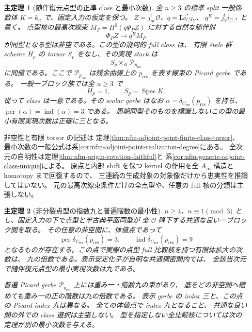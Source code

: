 \documentclass[11pt,a4paper]{ltjsarticle}
\numberwithin{equation}{section}
\newtheorem{maintheorem}{主定理}
\begin{document}
\begin{maintheorem}[随伴復元点型の正準 class と最小次数]
\label{main:nfm-finite-adjoint-point-classes}
全 $n\ge3$ の標準 split 一般係数体 $K=k_n$ で、固定入力の仮定を保つ。
$Z=j_{\mathrm{nc}}^!\mathcal O$、$q=\mathbf Li_C^*j_Y$、
$q^R=j_Y^!i_{C,*}$ と置く。
点型核の最高次線束 $M_P=H^0(q\Phi_PZ)$ に対する自然な随伴射
\[
 \Phi_PZ\longrightarrow q^RM_P
\]
が同型となる型は非空である。この型の幾何的 full class は、
有限 \'etale 群 scheme $H_p$ の torsor $S_p$ をなし、その実現 stack は
\[
 S_p\times_K\mathscr P_{p_{\mathrm{res}}}
\]
に同値である。ここで $\mathscr P_{p_{\mathrm{res}}}$ は残余曲線上の
$p_{\mathrm{res}}$ を表す線束の Picard gerbe である。
一般一ブロック族では全 $n\ge3$ で
\[
 H_p=1,\qquad S_p=\operatorname{Spec}K.
\]
従って class は一意である。その scalar gerbe はなお
$\alpha=\delta_{C_{\mathrm{res}}}(p_{\mathrm{res}})$ を持ち、
$\operatorname{per}(\alpha)=\operatorname{ind}(\alpha)=3$ である。
周期同型そのものを標識しないこの型の最小有限実現次数は正確に三となる。
\end{maintheorem}

非空性と有限 torsor の記述は
定理\ref{thm:nfm-adjoint-point-finite-class-torsor}、
最小次数の一般公式は系\ref{cor:nfm-adjoint-point-realization-degree}にある。
全次元の自明性は定理\ref{thm:nfm-origin-rotation-faithful}と
系\ref{cor:nfm-generic-adjoint-class-unique}による。
原点と内部 shift を保つ kernel の作用を全 $A_\infty$ 構造と homotopy まで回復するので、
三連続の生成対象の対象像だけから忠実性を推論してはいない。
元の最高次線束条件だけの全点型や、任意の full 核の分類は主張しない。

\begin{maintheorem}[非分裂点型の指数九と普遍階数の最小性]
\label{main:nfm-unsplit-picard-index-nine}
$n\ge4$、$n\equiv1\pmod3$ とし、固定入力の下で点型と半古典平面同型が
全 $\mathcal O$-降下する共通な良い一ブロック開を取る。
その任意の非空開に、体値点であって
\[
 \operatorname{per}\delta_{C_{\mathrm{res}}}(p_{\mathrm{res}})=3,
 \qquad\operatorname{ind}\delta_{C_{\mathrm{res}}}(p_{\mathrm{res}})=9
\]
となるものが存在する。この点で実際の点型 full 比較核を持つ有限体拡大の次数は、
九の倍数である。表示安定化子が自明な共通稠密開内では、
全該当次元で随伴復元点型の最小実現次数は九である。

普遍 Picard gerbe $\mathscr P_{p_{\mathrm{res}}}$ 上には重み一・階数九の束があり、
底をどの非空開へ縮めても重み一の正の階数は九の倍数である。
表示 gerbe の index 三と、この点の Picard index 九は異なる。
全ての体値点で index 九となること、
共通な良い開の外での class 選択は主張しない。
型を指定しない全比較核については次の定理が別の最小次数を与える。
\end{maintheorem}
\end{document}
